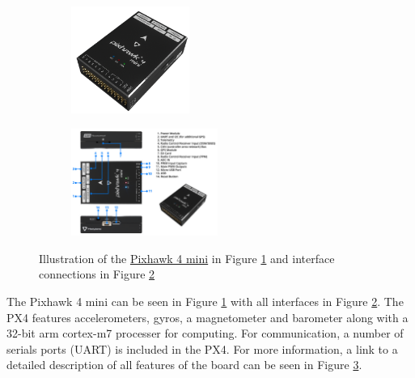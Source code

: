 \documentclass[../Head/report.tex]{subfiles}
\begin{document}
\begin{figure}[H]
    \centering
    \hspace{-6.0em}
    \begin{subfigure}[b]{.4\textwidth}
        \centering
        \includegraphics[height=3.5cm]{../Figures/px4_mini/px4_mini.png}
        \caption{}
        \label{fig:pixhawk_mini_four_board}
    \end{subfigure}
    \begin{subfigure}[b]{.33\textwidth}
        \centering
        \includegraphics[height=3.5cm]{../Figures/px4_mini/px4_mini_interfaces.png}
        \caption{}
        \label{fig:pixhawk_mini_four_interfaces}
    \end{subfigure}
    \caption{Illustration of the \href{https://docs.px4.io/master/en/flight_controller/pixhawk4_mini.html}{Pixhawk 4 mini} in Figure \ref{fig:pixhawk_mini_four_board} and interface connections in Figure \ref{fig:pixhawk_mini_four_interfaces}}
    \label{fig:pixhawk_mini_four}
\end{figure}

The Pixhawk 4 mini can be seen in Figure \ref{fig:pixhawk_mini_four_board} with all interfaces in Figure \ref{fig:pixhawk_mini_four_interfaces}. The PX4 features accelerometers, gyros, a magnetometer and barometer along with a 32-bit arm cortex-m7 processer for computing. For communication, a number of serials ports (UART) is included in the PX4. For more information, a link to a detailed description of all features of the board can be seen in Figure \ref{fig:pixhawk_mini_four}. 
\end{document}
